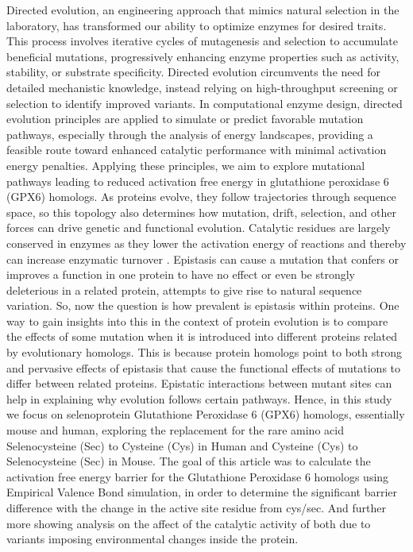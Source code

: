 \documentclass[journal=jacsat,manuscript=article]{achemso}
\begin{document}
{Directed evolution, an engineering approach that mimics natural selection in the laboratory, has transformed our ability to optimize enzymes for desired traits. This process involves iterative cycles of mutagenesis and selection to accumulate beneficial mutations, progressively enhancing enzyme properties such as activity, stability, or substrate specificity. Directed evolution circumvents the need for detailed mechanistic knowledge, instead relying on high-throughput screening or selection to identify improved variants. In computational enzyme design, directed evolution principles are applied to simulate or predict favorable mutation pathways, especially through the analysis of energy landscapes, providing a feasible route toward enhanced catalytic performance with minimal activation energy penalties. Applying these principles, we aim to explore mutational pathways leading to reduced activation free energy in glutathione peroxidase 6 (GPX6) homologs. As proteins evolve, they follow trajectories through sequence space, so this topology also determines how mutation, drift, selection, and other forces can drive genetic and functional evolution. Catalytic residues are largely conserved in enzymes as they lower the activation energy of reactions and thereby can increase enzymatic turnover \cite{Rees2024}. Epistasis can cause a mutation that confers or improves a function in one protein to have no effect or even be strongly deleterious in a related protein, attempts to give rise to natural sequence variation.\cite{Starr2016} So, now the question is how prevalent is epistasis within proteins.\cite{Starr2016} One way to gain insights into this in the context of protein evolution is to compare the effects of some mutation when it is introduced into different proteins related by evolutionary homologs.\cite{Starr2016} This is because protein homologs point to both strong and pervasive effects of epistasis that cause the functional effects of mutations to differ between related proteins.\cite{Starr2016} Epistatic interactions between mutant sites can help in explaining why evolution follows certain pathways.\cite{Storz2018} Hence, in this study we focus on selenoprotein Glutathione Peroxidase 6 (GPX6) homologs, essentially mouse and human, exploring the replacement for the rare amino acid Selenocysteine (Sec) to Cysteine (Cys) in Human and Cysteine (Cys) to Selenocysteine (Sec) in Mouse. The goal of this article was to calculate the activation free energy barrier for the Glutathione Peroxidase 6 homologs using Empirical Valence Bond simulation, in order to determine the significant barrier difference with the change in the active site residue from cys/sec. And further more showing analysis on the affect of the catalytic activity of both due to variants imposing environmental changes inside the protein.

}
\end{document}
